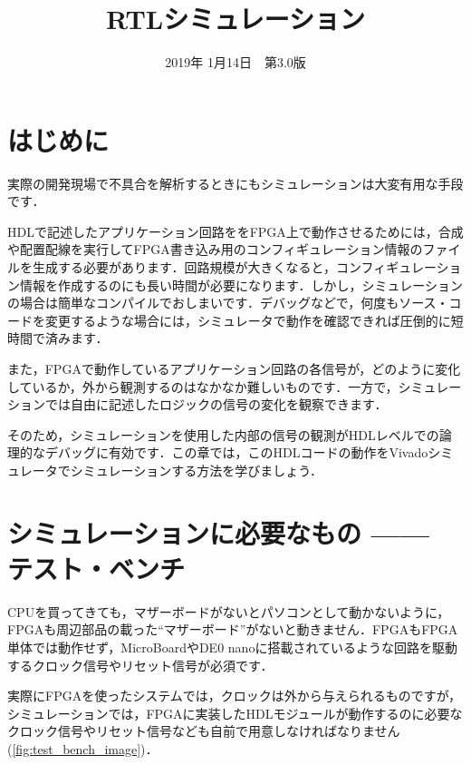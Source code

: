 \documentclass[a4paper,dvipdfmx]{jsarticle}
\begin{document}
\title{RTLシミュレーション}
\author{}
\date{2019年 1月14日~~第3.0版}
\maketitle

\section{はじめに}
実際の開発現場で不具合を解析するときにもシミュレーションは大変有用な手段です．

HDLで記述したアプリケーション回路ををFPGA上で動作させるためには，合成や配置配線を実行してFPGA書き込み用のコンフィギュレーション情報のファイルを生成する必要があります．回路規模が大きくなると，コンフィギュレーション情報を作成するのにも長い時間が必要になります．しかし，シミュレーションの場合は簡単なコンパイルでおしまいです．デバッグなどで，何度もソース・コードを変更するような場合には，シミュレータで動作を確認できれば圧倒的に短時間で済みます．

また，FPGAで動作しているアプリケーション回路の各信号が，どのように変化しているか，外から観測するのはなかなか難しいものです．一方で，シミュレーションでは自由に記述したロジックの信号の変化を観察できます．

そのため，シミュレーションを使用した内部の信号の観測がHDLレベルでの論理的なデバッグに有効です．この章では，このHDLコードの動作をVivadoシミュレータでシミュレーションする方法を学びましょう．

\section{シミュレーションに必要なもの —— テスト・ベンチ}
CPUを買ってきても，マザーボードがないとパソコンとして動かないように，FPGAも周辺部品の載った``マザーボード''がないと動きません．FPGAもFPGA単体では動作せず，MicroBoardやDE0 nanoに搭載されているような回路を駆動するクロック信号やリセット信号が必須です．

実際にFPGAを使ったシステムでは，クロックは外から与えられるものですが，シミュレーションでは，FPGAに実装したHDLモジュールが動作するのに必要なクロック信号やリセット信号なども自前で用意しなければなりません(\ref{fig:test_bench_image})．
\end{document}
